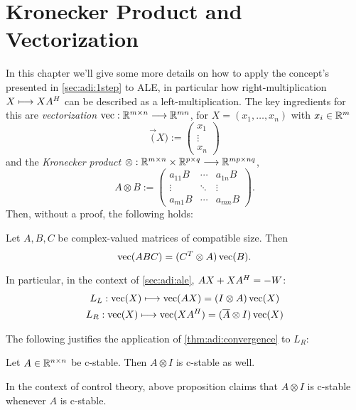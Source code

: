\chapter{Kronecker Product and Vectorization}

In this chapter we'll give some more details on how to apply the concept's presented in \autoref{sec:adi:1step} to \ac{ALE},
in particular how right-multiplication $X \longmapsto XA^H$ can be described as a left-multiplication.
The key ingredients for this are \emph{vectorization} $\operatorname{vec} : \mathbb{R}^{m\times n} \longrightarrow \mathbb{R}^{mn}$,
\eg for $X=(x_1,\ldots, x_n)$ with $x_i\in\mathbb{R}^m$
\begin{equation}
  \vec(X) := \begin{pmatrix}
    x_1 \\
    \vdots \\
    x_n
  \end{pmatrix}
\end{equation}
and the \emph{Kronecker product} $\otimes : \mathbb{R}^{m\times n} \times \mathbb{R}^{p\times q} \longrightarrow \mathbb{R}^{mp \times nq}$,
\begin{equation}
  A \otimes B := \begin{pmatrix}
    a_{11} B & \cdots & a_{1n} B \\
    \vdots   & \ddots & \vdots \\
    a_{m1} B & \cdots & a_{mn} B
  \end{pmatrix}
  .
\end{equation}
Then, without a proof, the following holds:

\begin{proposition}
  Let $A, B, C$ be complex-valued matrices of compatible size. Then
  \begin{equation*}
    \operatorname{vec}(ABC) = (C^T \otimes A) \operatorname{vec}(B)
    .
  \end{equation*}
\end{proposition}

In particular, in the context of \autoref{sec:adi:ale},
$AX + XA^H = -W$:
\begin{gather}
  L_L : \vec(X) \mapsto \vec(AX) = (I \otimes A) \vec(X) \\
  L_R : \vec(X) \mapsto \vec(XA^\HT) = (\conj A \otimes I) \vec(X)
\end{gather}

The following justifies the application of \autoref{thm:adi:convergence} to $L_R$:

\begin{proposition}
  Let $A\in\mathbb{R}^{n\times n}$ be c-stable. Then $A \otimes I$ is c-stable as well.
\end{proposition}
\begin{remark}
  In the context of control theory, above proposition claims that $A \otimes I$ is c-stable whenever $A$ is c-stable.
\end{remark}
